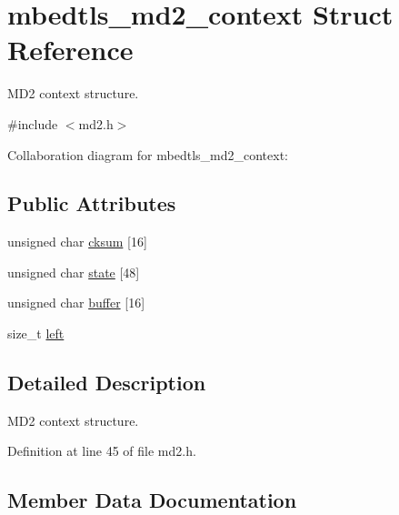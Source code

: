 \hypertarget{structmbedtls__md2__context}{}\section{mbedtls\+\_\+md2\+\_\+context Struct Reference}
\label{structmbedtls__md2__context}


M\+D2 context structure.  




{\ttfamily \#include $<$md2.\+h$>$}



Collaboration diagram for mbedtls\+\_\+md2\+\_\+context\+:
\subsection*{Public Attributes}
\begin{DoxyCompactItemize}
\item 
unsigned char \mbox{\hyperlink{structmbedtls__md2__context_a12653607373c617159907a4b5d533c94}{cksum}} \mbox{[}16\mbox{]}
\item 
unsigned char \mbox{\hyperlink{structmbedtls__md2__context_a2849ae4cd7a078459349c046e97ae503}{state}} \mbox{[}48\mbox{]}
\item 
unsigned char \mbox{\hyperlink{structmbedtls__md2__context_ae08fe6f2378ed0bb8f226b8905924ad8}{buffer}} \mbox{[}16\mbox{]}
\item 
size\+\_\+t \mbox{\hyperlink{structmbedtls__md2__context_a5b070937560df586b3b20287cc6c4bbe}{left}}
\end{DoxyCompactItemize}


\subsection{Detailed Description}
M\+D2 context structure. 

Definition at line 45 of file md2.\+h.



\subsection{Member Data Documentation}
\mbox{\label{structmbedtls__md2__context_ae08fe6f2378ed0bb8f226b8905924ad8}} 
